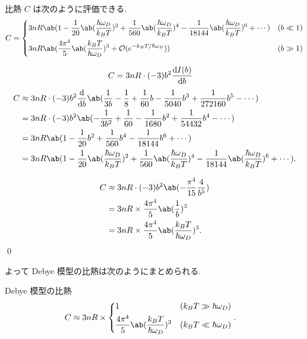 \documentclass[uplatex,diffipdfmx,a4paper,11pt]{jlreq}
\makeatletter
\numberwithin{equation}{section}
\theoremstyle{definition}
\renewenvironment{proof}[1][\proofname]{\par
  \normalfont
  \topsep6\p@\@plus6\p@ \trivlist
  \item[\hskip\labelsep{\bfseries #1}\@addpunct{\bfseries}]\ignorespaces\quad\par
}{%
  \qed\endtrivlist\@endpefalse
}
\renewcommand\proofname{証明}
\makeatother
\begin{document}
\begin{theorem}
  比熱 $C$ は次のように評価できる.
  \begin{align}
    C =
    \begin{dcases}
      3nR\ab(1 - \frac{1}{20}\ab(\frac{\hbar\omega_D}{k_BT})^2 + \frac{1}{560}\ab(\frac{\hbar\omega_D}{k_BT})^4 - \frac{1}{18144}\ab(\frac{\hbar\omega_D}{k_BT})^6 + \cdots) & (b\ll 1) \\
      3nR\ab(\frac{4\pi^4}{5}\ab(\frac{k_BT}{\hbar\omega_D})^3 + \mathcal{O}(e^{-k_BT/\hbar\omega_D}))                                                                       & (b\gg 1)
    \end{dcases}
  \end{align}
\end{theorem}
\begin{proof}
  \begin{align}
    C & = 3nR\cdot (-3)b^2\diff{I(b)}{b}
  \end{align}
  \begin{align}
    C & \approx 3nR\cdot (-3)b^2\diff{}{b}\ab(\frac{1}{3b} - \frac{1}{8} + \frac{1}{60}b - \frac{1}{5040}b^3 + \frac{1}{272160}b^5 - \cdots)                                      \\
      & = 3nR\cdot (-3)b^2\ab(-\frac{1}{3b^2} + \frac{1}{60} - \frac{1}{1680}b^2 + \frac{1}{54432}b^4 - \cdots)                                                                   \\
      & = 3nR\ab(1 - \frac{1}{20}b^2 + \frac{1}{560}b^4 - \frac{1}{18144}b^6 + \cdots)                                                                                            \\
      & = 3nR\ab(1 - \frac{1}{20}\ab(\frac{\hbar\omega_D}{k_BT})^2 + \frac{1}{560}\ab(\frac{\hbar\omega_D}{k_BT})^4 - \frac{1}{18144}\ab(\frac{\hbar\omega_D}{k_BT})^6 + \cdots).
  \end{align}

  \begin{align}
    C & \approx 3nR\cdot(-3)b^2\ab(-\frac{\pi^4}{15}\frac{4}{b^5})    \\
      & = 3nR\times\frac{4\pi^4}{5}\ab(\frac{1}{b})^3                 \\
      & = 3nR\times\frac{4\pi^4}{5}\ab(\frac{k_BT}{\hbar\omega_D})^3.
  \end{align}
\end{proof}

よって Debye 模型の比熱は次のようにまとめられる.
\begin{itembox}[l]{Debye 模型の比熱}
  \begin{align}
    C & \approx 3nR\times\begin{dcases}
                           1                                                 & (k_BT\gg \hbar\omega_D) \\
                           \frac{4\pi^4}{5}\ab(\frac{k_BT}{\hbar\omega_D})^3 & (k_BT\ll \hbar\omega_D)
                         \end{dcases}.
  \end{align}
\end{itembox}
\end{document}
